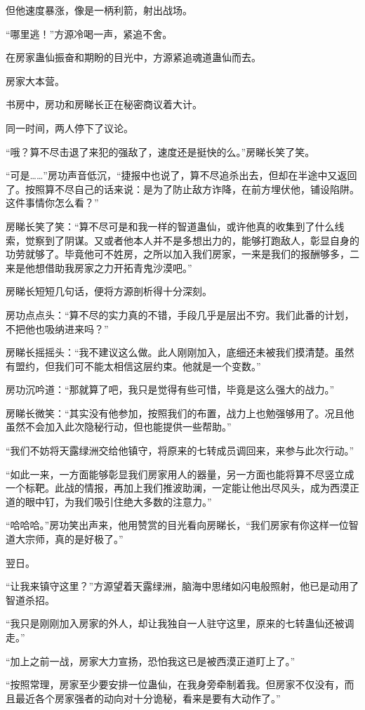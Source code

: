 \begin{this_body}
但他速度暴涨，像是一柄利箭，射出战场。

“哪里逃！”方源冷喝一声，紧追不舍。

在房家蛊仙振奋和期盼的目光中，方源紧追魂道蛊仙而去。

房家大本营。

书房中，房功和房睇长正在秘密商议着大计。

同一时间，两人停下了议论。

“哦？算不尽击退了来犯的强敌了，速度还是挺快的么。”房睇长笑了笑。

“可是……”房功声音低沉，“捷报中也说了，算不尽追杀出去，但却在半途中又返回了。按照算不尽自己的话来说：是为了防止敌方诈降，在前方埋伏他，铺设陷阱。这件事情你怎么看？”

房睇长笑了笑：“算不尽可是和我一样的智道蛊仙，或许他真的收集到了什么线索，觉察到了阴谋。又或者他本人并不是多想出力的，能够打跑敌人，彰显自身的功劳就够了。毕竟他可不姓房，之所以加入我们房家，一来是我们的报酬够多，二来是他想借助我房家之力开拓青鬼沙漠吧。”

房睇长短短几句话，便将方源剖析得十分深刻。

房功点点头：“算不尽的实力真的不错，手段几乎是层出不穷。我们此番的计划，不把他也吸纳进来吗？”

房睇长摇摇头：“我不建议这么做。此人刚刚加入，底细还未被我们摸清楚。虽然有盟约，但我们可不能太相信这层约束。他就是一个变数。”

房功沉吟道：“那就算了吧，我只是觉得有些可惜，毕竟是这么强大的战力。”

房睇长微笑：“其实没有他参加，按照我们的布置，战力上也勉强够用了。况且他虽然不会加入此次隐秘行动，但也能提供一些帮助。”

“我们不妨将天露绿洲交给他镇守，将原来的七转成员调回来，来参与此次行动。”

“如此一来，一方面能够彰显我们房家用人的器量，另一方面也能将算不尽竖立成一个标靶。此战的情报，再加上我们推波助澜，一定能让他出尽风头，成为西漠正道的眼中钉，为我们吸引住绝大多数的注意力。”

“哈哈哈。”房功笑出声来，他用赞赏的目光看向房睇长，“我们房家有你这样一位智道大宗师，真的是好极了。”

翌日。

“让我来镇守这里？”方源望着天露绿洲，脑海中思绪如闪电般照射，他已是动用了智道杀招。

“我只是刚刚加入房家的外人，却让我独自一人驻守这里，原来的七转蛊仙还被调走。”

“加上之前一战，房家大力宣扬，恐怕我这已是被西漠正道盯上了。”

“按照常理，房家至少要安排一位蛊仙，在我身旁牵制着我。但房家不仅没有，而且最近各个房家强者的动向对十分诡秘，看来是要有大动作了。”


\end{this_body}

